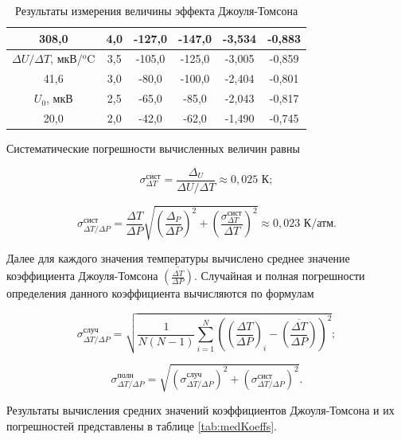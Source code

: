 \documentclass[a4paper,12pt]{article} %
\begin{document}
\begin{table}[]
\begin{tabular}{|c|c|c|c|c|c|}
        308,0 & 4,0 & -127,0 & -147,0 & -3,534 & -0,883 \\ \hline
        $\Delta U/\Delta T$, мкВ/$^\text{o}$C & 3,5 & -105,0 & -125,0 & -3,005 & -0,859 \\ \hline
        41,6 & 3,0 & -80,0 & -100,0 & -2,404 & -0,801 \\ \hline
        $U_0$, мкВ & 2,5 & -65,0 & -85,0 & -2,043 & -0,817 \\ \hline
        20,0 & 2,0 & -42,0 & -62,0 & -1,490 & -0,745 \\ \hline
        \end{tabular}
    \caption{Результаты измерения величины эффекта Джоуля-Томсона}
    \label{tab:JTomson}
\end{table}

Систематические погрешности вычисленных величин равны

\begin{equation}
    \sigma^\text{сист}_{\Delta T} = \frac{\Delta_U}{\Delta U / \Delta T} \approx 0,025 \text{ К}; 
\end{equation}

\begin{equation}
    \sigma^\text{сист}_{\Delta T/\Delta P} = \frac{\Delta T}{\Delta P} \sqrt{(\frac{\Delta_P}{\Delta P})^2 + (\frac{\sigma^\text{сист}_{\Delta T}}{\Delta T})^2} \approx 0,023 \text{ К/атм.}
\end{equation}

Далее для каждого значения температуры вычислено среднее значение коэффициента Джоуля-Томсона $\overline{(\frac{\Delta T}{\Delta P})}$. Случайная и полная погрешности определения данного коэффициента вычисляются по формулам

\begin{equation}
        \sigma^\text{случ}_{\Delta T/\Delta P} = \sqrt{\frac{1}{N(N-1)} \sum\limits_{i = 1}^N((\frac{\Delta T}{\Delta P})_i - \overline{(\frac{\Delta T}{\Delta P})})^2};
\end{equation}

\begin{equation}
    \sigma^\text{полн}_{\Delta T/\Delta P} = \sqrt{(\sigma^\text{случ}_{\Delta T/\Delta P})^2 + (\sigma^\text{сист}_{\Delta T/\Delta P})^2}.
\end{equation}

Результаты вычисления средних значений коэффициентов Джоуля-Томсона и их погрешностей представлены в таблице \ref{tab:medKoeffs}.
\end{document}
